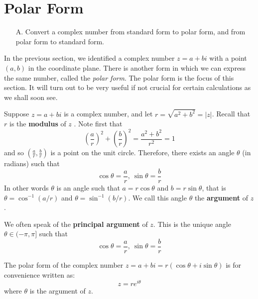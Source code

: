 \section{Polar Form}

\begin{outcome}
\begin{enumerate}
\item[A.] Convert a complex number from standard form to polar form, and from polar form to standard form. 
\end{enumerate}
\end{outcome}

In the previous section, we identified a complex number $z=a+bi$ with
a point $\left( a, b\right)$ in the coordinate plane. There is 
another form in which we can express the same number, called the {\em
polar form\em}. The polar form is the focus of this section. It will turn out to be
very useful if not crucial for certain calculations as we shall soon
see.

Suppose $z=a+bi$ is a complex number,  and let 
$r=\sqrt{a^{2}+b^{2}} = |z|$. Recall that $r$ is the \textbf{modulus} of $z$ . Note first that
\begin{equation*}
\left( \frac{a}{r} \right) ^{2}+\left( \frac{b}{r}\right) ^{2}=   \frac{a^2+b^2}{r^2}=1
\end{equation*}
and so $\left( \frac{a}{r},\frac{b}{r}\right)$
is a point on the unit circle. Therefore, there exists an angle  $
\theta$ (in radians) such that
\begin{equation*}
\cos \theta =\frac{a}{r},\ \sin \theta =\frac{b}{r}
\end{equation*}
In other words $\theta$ is an angle such
that $ a = r\cos \theta$ and $b=r \sin \theta$, that is $\theta = \cos^{-1}(a/r)$ and $\theta = \sin^{-1}(b/r)$. We call
this angle $\theta$ the \textbf{argument}  of $z$. 

We often speak of the \textbf{principal argument} of $z$. This is the unique angle $\theta \in (-\pi, \pi]$ such that 
\begin{equation*}
\cos \theta =\frac{a}{r},\ \sin \theta =\frac{b}{r}
\end{equation*}

The polar form of the complex number $z=a+bi = r \left( \cos \theta +i\sin \theta \right)$ is for convenience written as:
\begin{equation*}
z = r e^{i \theta}
\end{equation*}
where $\theta $ is the argument of
$z$. 

